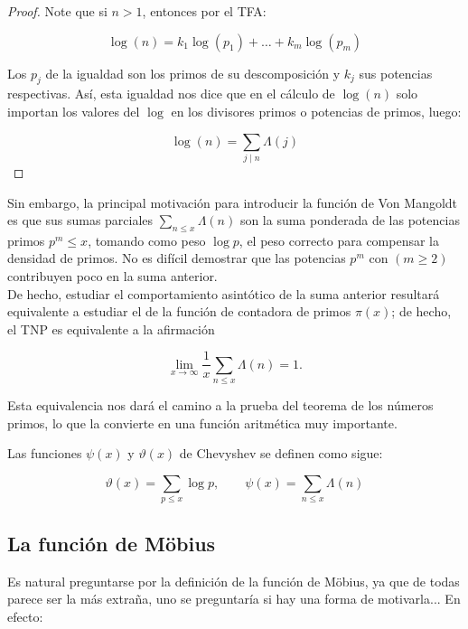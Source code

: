 \begin{proof}

Note que si $n>1$, entonces por el TFA:

$$\log(n)=k_1\log(p_1)+\ldots+k_m\log(p_m)$$

 Los $p_j$ de la igualdad son los primos de su descomposición y $k_j$ sus potencias respectivas. Así, esta igualdad nos dice que en el cálculo de $\log(n)$ solo importan los valores del $\log$ en los divisores primos o potencias de primos, luego:

 $$\log(n)=\sum_{j\mid n}\Lambda(j)$$
\end{proof}

Sin embargo, la principal motivación para introducir la función de Von Mangoldt es que sus sumas parciales $\displaystyle\sum_{n \leq x} \Lambda(n)$ son la suma ponderada de las potencias primos $p^m \leq x$, tomando como peso $\log p$, el peso correcto para compensar la densidad de primos. No es difícil demostrar que las potencias $p^m$ con $(m \geq 2)$ contribuyen poco en la suma anterior.\\

De hecho, estudiar el comportamiento asintótico de la suma anterior resultará equivalente a estudiar el de la función de contadora de primos $\pi(x)$; de hecho, el TNP es equivalente a la afirmación

$$
\lim _{x \rightarrow \infty} \frac{1}{x} \sum_{n \leq x} \Lambda(n)=1 .
$$

Esta equivalencia nos dará el camino a la prueba del teorema de los números primos, lo que la convierte en una función aritmética muy importante.\cite{hildebrand2006introduction}

\begin{definition}

Las funciones $\psi(x)$ y $\vartheta(x)$ de Chevyshev se definen como sigue:

$$\vartheta(x)=\sum_{p\leq x}\log p, \quad \quad \psi(x)=\sum_{n \leq x} \Lambda(n)$$

\end{definition}

\subsection{La función de Möbius}

Es natural preguntarse por la definición de la función de Möbius, ya que de todas parece ser la más extraña, uno se preguntaría si hay una forma de motivarla... En efecto:\\

